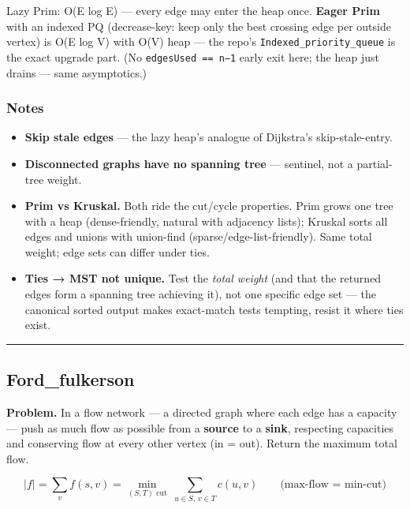 \documentclass[
  10pt,
  letterpaper,
  onecolumn]{article}
\providecommand{\tightlist}{%
  \setlength{\itemsep}{0pt}\setlength{\parskip}{0pt}}
\begin{document}
Lazy Prim: O(E log E) --- every edge may enter the heap once.
\textbf{Eager Prim} with an indexed PQ (decrease-key: keep only the best
crossing edge per outside vertex) is O(E log V) with O(V) heap --- the
repo's \texttt{Indexed\_priority\_queue} is the exact upgrade part. (No
\texttt{edgesUsed\ ==\ n−1} early exit here; the heap just drains ---
same asymptotics.)

\hypertarget{notes-22}{%
\subsubsection{Notes}\label{notes-22}}

\begin{itemize}
\tightlist
\item
  \textbf{Skip stale edges} --- the lazy heap's analogue of Dijkstra's
  skip-stale-entry.
\item
  \textbf{Disconnected graphs have no spanning tree} --- sentinel, not a
  partial-tree weight.
\item
  \textbf{Prim vs Kruskal.} Both ride the cut/cycle properties. Prim
  grows one tree with a heap (dense-friendly, natural with adjacency
  lists); Kruskal sorts all edges and unions with union-find
  (sparse/edge-list-friendly). Same total weight; edge sets can differ
  under ties.
\item
  \textbf{Ties → MST not unique.} Test the \emph{total weight} (and that
  the returned edges form a spanning tree achieving it), not one
  specific edge set --- the canonical sorted output makes exact-match
  tests tempting, resist it where ties exist.
\end{itemize}

\begin{center}\rule{0.5\linewidth}{0.5pt}\end{center}

\hypertarget{ford_fulkerson}{%
\subsection{Ford\_fulkerson}\label{ford_fulkerson}}

\textbf{Problem.} In a flow network --- a directed graph where each edge
has a capacity --- push as much flow as possible from a \textbf{source}
to a \textbf{sink}, respecting capacities and conserving flow at every
other vertex (in = out). Return the maximum total flow.

\begin{equation*}
|f|=\sum_{v}f(s,v)=\min_{(S,T)\text{ cut}}\ \sum_{u\in S,\,v\in T}c(u,v)
\qquad\text{(max-flow = min-cut)}
\end{equation*}
\end{document}
